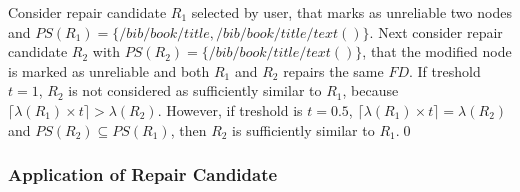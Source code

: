 \begin{example}\label{tresholdExample}
Consider repair candidate $R_1$ selected by user, that marks as unreliable two nodes and $PS(R_1) = \{/bib/book/title, /bib/book/title/text()\}$. Next consider repair candidate $R_2$ with $PS(R_2) = \{/bib/book/title/text()\}$, that the modified node is marked as unreliable and both $R_1$ and $R_2$ repairs the same $FD$. If treshold $t=1$, $R_2$ is not considered as sufficiently similar to $R_1$, because $\lceil\lambda(R_1) \times t\rceil > \lambda(R_2)$. However, if treshold is $t=0.5$, $\lceil\lambda(R_1) \times t\rceil = \lambda(R_2)$ and $PS(R_2) \subseteq PS(R_1)$, then $R_2$ is sufficiently similar to $R_1$.\qed
\end{example}

\subsubsection{Application of Repair Candidate}
